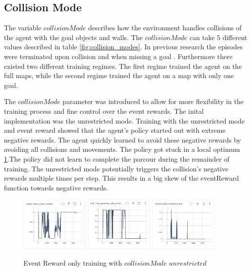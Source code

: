 \subsection{Collision Mode}

The variable $collisionMode$ describes how the environment handles collisions of the agent with the goal objects and walls. The $collisionMode$ can take 5 different values described in table \ref{fig:collision_modes}. In previous research the episodes were terminated upon collision and when missing a goal \autocite{maximilian}. Furthermore there existed two different training regimes. The first regime trained the agent on the full maps, while the second regime trained the agent on a map with only one goal.

The $collisionMode$ parameter was introduced to allow for more flexibility in the training process and fine control over the event rewards. The inital implementation was the unrestricted mode. Training with the unrestricted mode and event reward showed that the agent's policy started out with extreme negative rewards. The agent quickly learned to avoid these negative rewards by avoiding all collisions and movements. The policy got stuck in a local optimum \ref{fig:event_reward_only_collisionModeUnrestricted_event_reward}.The policy did not learn to complete the parcour during the remainder of training. The unrestricted mode potentially triggers the collision's negative rewards multiple times per step. This results in a big skew of the eventReward function towards negative rewards.

\begin{figure}
    \centering
    \includegraphics[width=0.3\textwidth]{Bilder/tensorboard_images/eventRewardOnly_collisionModeUnrestricted_eventReward.png}
    \includegraphics[width=0.3\textwidth]{Bilder/tensorboard_images/eventRewardOnly_collisionModeUnrestricted_collisionRate.png}
    \includegraphics[width=0.3\textwidth]{Bilder/tensorboard_images/eventRewardOnly_collisionModeUnrestricted_goalCompletionRate.png}
    \caption{Event Reward only training with $collisionMode$ $unrestricted$}
    \label{fig:event_reward_only_collisionModeUnrestricted_event_reward}
\end{figure}

